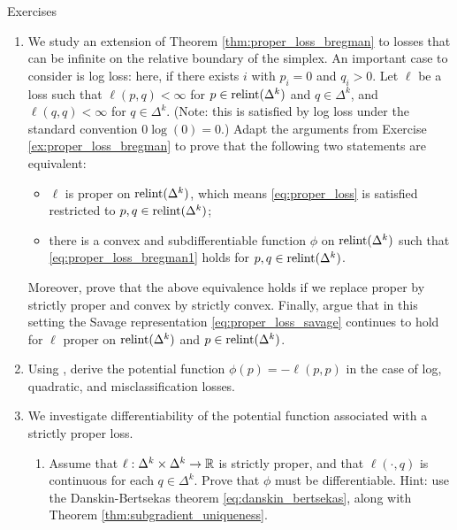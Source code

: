 \begin{xcb}{Exercises}
\begin{enumerate}[label=\thechapter.\arabic*]
\begin{enumerate}[label=\alph*.]
\item Assume further that $\ell$ is strictly proper. Extend the arguments in the
  last part to show that $\phi$ is strictly convex. Hint: recall Exercise
  \ref{ex:strict_convexity_subgradient} again.
\end{enumerate}

\item \label{ex:proper_loss_unbounded}
  We study an extension of Theorem \ref{thm:proper_loss_bregman} to losses
  that can be infinite on the relative boundary of the simplex. An important
  case to consider is log loss: here,  if there exists $i$ with $p_i = 0$ and $q_i >
  0$. Let $\ell$ be a loss such that $\ell(p,q) < \infty$ for $p \in
  \operatorname{relint}(\Delta^k)$ and $q \in \Delta^k$, and $\ell(q,q) < \infty$ for $q \in
  \Delta^k$. (Note: this is satisfied by log loss under the standard convention
  $0 \log(0) = 0$.) Adapt the arguments from Exercise
  \ref{ex:proper_loss_bregman} to prove that the following two statements are
  equivalent: 
  \begin{itemize}
  \item $\ell$ is proper on $\operatorname{relint}(\Delta^k)$, which means
    \eqref{eq:proper_loss} is satisfied restricted to $p,q \in
    \operatorname{relint}(\Delta^k)$;    
  \item there is a convex and subdifferentiable function $\phi$ on 
    $\operatorname{relint}(\Delta^k)$ such that \eqref{eq:proper_loss_bregman1} holds for 
    $p,q \in\operatorname{relint}(\Delta^k)$.   
  \end{itemize}
  Moreover, prove that the above equivalence holds if we replace proper by
  strictly proper and convex by strictly convex. Finally, argue that in this
  setting the Savage representation \eqref{eq:proper_loss_savage} continues to
  hold for $\ell$ proper on $\operatorname{relint}(\Delta^k)$ and $p \in \operatorname{relint}(\Delta^k)$.    

\item \label{ex:proper_loss_examples}
  Using , derive the potential
  function $\phi(p) = -\ell(p,p)$ in the case of log, quadratic, and
  misclassification losses.   

\item \label{ex:proper_loss_differentiable}
  We investigate differentiability of the potential function associated with a
  strictly proper loss.   
  
\begin{enumerate}[label=\alph*.]
\item Assume that $\ell : \Delta^k \times \Delta^k \to \mathbb{R}$ is strictly proper,
  and that $\ell(\cdot, q)$ is continuous for each $q \in \Delta^k$. Prove that
  $\phi$ must be differentiable. Hint: use the Danskin-Bertsekas theorem
  \eqref{eq:danskin_bertsekas}, along with Theorem
  \ref{thm:subgradient_uniqueness}. 


\end{enumerate}
\end{enumerate}
\end{xcb}
